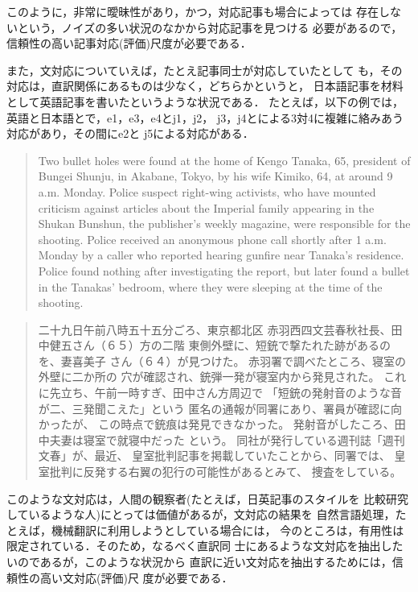 このように，非常に曖昧性があり，かつ，対応記事も場合によっては
存在しないという，ノイズの多い状況のなかから対応記事を見つける
必要があるので，信頼性の高い記事対応(評価)尺度が必要である．

また，文対応についていえば，たとえ記事同士が対応していたとして
も，その対応は，直訳関係にあるものは少なく，どちらかというと，
日本語記事を材料として英語記事を書いたというような状況である．
たとえば，以下の例では，英語と日本語とで，e1，e3，e4とj1，j2，
j3，j4とによる3対4に複雑に絡みあう対応があり，その間にe2と
j5による対応がある．

\begin{quote}
  \footnotesize
{} Two bullet holes were found at the home of
Kengo Tanaka, 65, president of Bungei Shunju,
in Akabane, Tokyo, by his wife Kimiko, 64, 
at around 9 a.m. Monday. 
 Police suspect right-wing activists, who have
mounted criticism against articles about the
Imperial family appearing in the Shukan Bunshun,
the publisher's weekly magazine, were responsible
for the shooting. 
 Police received an anonymous phone call 
shortly after 1 a.m. Monday by a caller who 
reported hearing gunfire near Tanaka's residence. 
 Police found nothing after investigating the 
report, but later found a bullet in the Tanakas' 
bedroom, where they were sleeping at the time of 
the shooting. 
\end{quote}

\begin{quote}
  \footnotesize
{} 二十九日午前八時五十五分ごろ、東京都北区
赤羽西四文芸春秋社長、田中健五さん（６５）方の二階
東側外壁に、短銃で撃たれた跡があるのを、妻喜美子
さん（６４）が見つけた。 
 赤羽署で調べたところ、寝室の外壁に二か所の
穴が確認され、銃弾一発が寝室内から発見された。 
 これに先立ち、午前一時すぎ、田中さん方周辺で
「短銃の発射音のような音が二、三発聞こえた」という
 匿名の通報が同署にあり、署員が確認に向かったが、
 この時点で銃痕は発見できなかった。 
 発射音がしたころ、田中夫妻は寝室で就寝中だった
 という。 
 同社が発行している週刊誌「週刊文春」が、最近、
皇室批判記事を掲載していたことから、同署では、
皇室批判に反発する右翼の犯行の可能性があるとみて、
捜査をしている。 
\end{quote}

このような文対応は，人間の観察者(たとえば，日英記事のスタイルを
比較研究しているような人)にとっては価値があるが，文対応の結果を
自然言語処理，たとえば，機械翻訳に利用しようとしている場合には，
今のところは，有用性は限定されている．そのため，なるべく直訳同
士にあるような文対応を抽出したいのであるが，このような状況から
直訳に近い文対応を抽出するためには，信頼性の高い文対応(評価)尺
度が必要である．


